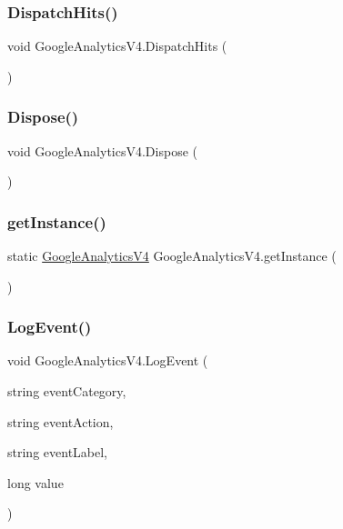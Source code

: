 \subsubsection{\texorpdfstring{Dispatch\+Hits()}{DispatchHits()}}
{\footnotesize\ttfamily void Google\+Analytics\+V4.\+Dispatch\+Hits (\begin{DoxyParamCaption}{ }\end{DoxyParamCaption})}

\mbox{\label{class_google_analytics_v4_acde2f7a3194d1155419248307db2ddf3}} 
\subsubsection{\texorpdfstring{Dispose()}{Dispose()}}
{\footnotesize\ttfamily void Google\+Analytics\+V4.\+Dispose (\begin{DoxyParamCaption}{ }\end{DoxyParamCaption})}

\mbox{\label{class_google_analytics_v4_aa4052b46e75ed98566a2cbef99170667}} 
\subsubsection{\texorpdfstring{get\+Instance()}{getInstance()}}
{\footnotesize\ttfamily static \hyperlink{class_google_analytics_v4}{Google\+Analytics\+V4} Google\+Analytics\+V4.\+get\+Instance (\begin{DoxyParamCaption}{ }\end{DoxyParamCaption})\hspace{0.3cm}{\ttfamily [static]}}

\mbox{\label{class_google_analytics_v4_a98e6990ad085cef4d3f5bf34e84bed13}} 
\subsubsection{\texorpdfstring{Log\+Event()}{LogEvent()}\hspace{0.1cm}{\footnotesize\ttfamily [1/2]}}
{\footnotesize\ttfamily void Google\+Analytics\+V4.\+Log\+Event (\begin{DoxyParamCaption}\item[{string}]{event\+Category,  }\item[{string}]{event\+Action,  }\item[{string}]{event\+Label,  }\item[{long}]{value }\end{DoxyParamCaption})}

